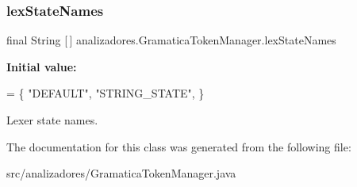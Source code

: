 \subsubsection{\texorpdfstring{lex\+State\+Names}{lexStateNames}}
{\footnotesize\ttfamily final String \mbox{[}$\,$\mbox{]} analizadores.\+Gramatica\+Token\+Manager.\+lex\+State\+Names\hspace{0.3cm}{\ttfamily [static]}}

{\bfseries Initial value\+:}
\begin{DoxyCode}
= \{
   \textcolor{stringliteral}{"DEFAULT"}, 
   \textcolor{stringliteral}{"STRING\_STATE"}, 
\}
\end{DoxyCode}
Lexer state names. 

The documentation for this class was generated from the following file\+:\begin{DoxyCompactItemize}
\item 
src/analizadores/Gramatica\+Token\+Manager.\+java\end{DoxyCompactItemize}
